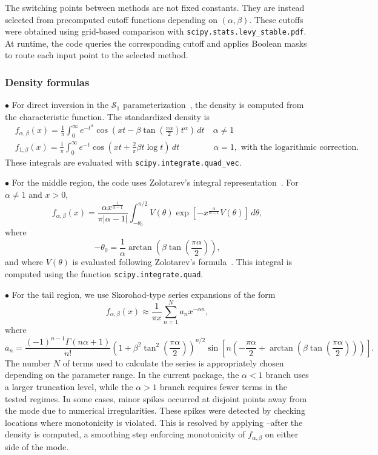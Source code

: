 The switching points between methods are not fixed constants. They are instead selected from precomputed cutoff functions depending on $(\alpha,\beta)$. These cutoffs were obtained using grid-based comparison with \texttt{scipy.stats.levy\_stable.pdf}. At runtime, the code queries the corresponding cutoff and applies Boolean masks to route each input point to the selected method.

\subsubsection*{Density formulas}

$\bullet$ For direct inversion in the $\mathcal{S}_1$ parameterization~\cite{NolanJohnP2020USDM}, the density is computed from the characteristic function. The standardized density is
\begin{align*}
    & f_{\alpha,\beta}(x) = \frac{1}{\pi} \int_0^\infty e^{-t^\alpha} \cos\left( xt-\beta\tan\left(\frac{\pi\alpha}{2}\right)t^\alpha\right) \,dt
    \quad \alpha \neq 1 \\
    & f_{1,\beta}(x) = \frac{1}{\pi} \int_0^\infty e^{-t} \cos\left( xt+\frac{2}{\pi}\beta t\log t \right) \,dt
    \qquad \qquad \alpha = 1, \text{ with the logarithmic correction.}
\end{align*}
These integrals are evaluated with \texttt{scipy.integrate.quad\_vec}.



\noindent
$\bullet$ For the middle region, the code uses Zolotarev's integral representation~\cite{Zolotarev1986}. For $\alpha\neq1$ and $x>0$,
\[
f_{\alpha,\beta}(x) = \frac{\alpha x^{\frac{1}{\alpha-1}}} {\pi |\alpha-1|}
\int_{-\theta_0}^{\pi/2} V(\theta) \exp\left[ -x^{\frac{\alpha}{\alpha-1}}V(\theta)\right]\,d\theta,
\]
where
\[
-\theta_0= \frac{1}{\alpha}\arctan\left(\beta\tan\left(\frac{\pi\alpha}{2}\right)\right),
\]
and where $V(\theta)$ is evaluated following Zolotarev's formula~\cite{Zolotarev1986}. This integral is computed using the function \texttt{scipy.integrate.quad}.



\noindent
$\bullet$ For the tail region, we use Skorohod-type series expansions \cite{sko2, Wintner1941CauchySingularities, Pollard1946LaplaceIntegral} of the form
\[
f_{\alpha,\beta}(x) \approx \frac{1}{\pi x} \sum_{n=1}^{N} a_n x^{-\alpha n},
\]
where
\[
a_n = \frac{(-1)^{n-1}\Gamma(n\alpha+1)}{n!} \left( 1+\beta^2\tan^2\left(\frac{\pi\alpha}{2}\right) \right)^{n/2} \sin\left[n\left(
-\frac{\pi\alpha}{2} + \arctan\left( \beta\tan\left(\frac{\pi\alpha}{2}\right) \right) \right) \right].
\]
The number $N$ of terms used to calculate the series is appropriately chosen depending on the parameter range. In the current package, the $\alpha<1$ branch uses a larger truncation level, while the $\alpha>1$ branch requires fewer terms in the tested regimes.
In some cases, minor spikes occurred at disjoint points away from the mode due to numerical irregularities. These spikes were detected by checking locations where monotonicity is violated. This is resolved by applying --after the density is computed, a smoothing step enforcing monotonicity of $f_{\alpha,\beta}$ on either side of the mode.

